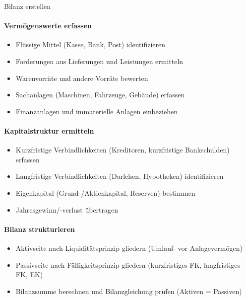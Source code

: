 \begin{KR}{Bilanz erstellen}\\
\paragraph{Vermögenswerte erfassen}
\begin{itemize}
    \item Flüssige Mittel (Kasse, Bank, Post) identifizieren
    \item Forderungen aus Lieferungen und Leistungen ermitteln
    \item Warenvorräte und andere Vorräte bewerten
    \item Sachanlagen (Maschinen, Fahrzeuge, Gebäude) erfassen
    \item Finanzanlagen und immaterielle Anlagen einbeziehen
\end{itemize}

\paragraph{Kapitalstruktur ermitteln}
\begin{itemize}
    \item Kurzfristige Verbindlichkeiten (Kreditoren, kurzfristige Bankschulden) erfassen
    \item Langfristige Verbindlichkeiten (Darlehen, Hypotheken) identifizieren
    \item Eigenkapital (Grund-/Aktienkapital, Reserven) bestimmen
    \item Jahresgewinn/-verlust übertragen
\end{itemize}

\paragraph{Bilanz strukturieren}
\begin{itemize}
    \item Aktivseite nach Liquiditätsprinzip gliedern (Umlauf- vor Anlagevermögen)
    \item Passivseite nach Fälligkeitsprinzip gliedern (kurzfristiges FK, langfristiges FK, EK)
    \item Bilanzsumme berechnen und Bilanzgleichung prüfen (Aktiven = Passiven)
\end{itemize}
\end{KR}

